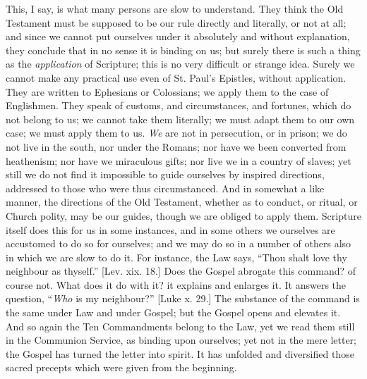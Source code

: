 This, I say, is what many persons are slow to understand. They
think the Old Testament must be supposed to be our rule directly and
literally, or not at all; and since we cannot put ourselves under it
absolutely and without explanation, they conclude that in no sense it
is binding on us; but surely there is such a thing as the \emph{application}
of Scripture; this is no very difficult or strange idea. Surely we
cannot make any practical use even of St. Paul's Epistles, without
application. They are written to Ephesians or Colossians; we apply
them to the case of Englishmen. They speak of customs, and
circumstances, and fortunes, which do not belong to us; we cannot take
them literally; we must adapt them to our own case; we must apply them
to us. \emph{We} are not in persecution, or in prison; we do not live
in the south, nor under the Romans; nor have we been converted from
heathenism; nor have we miraculous gifts; nor live we in a country of
slaves; yet still we do not find it impossible to guide ourselves by
inspired directions, addressed to those who were thus circumstanced.
And in somewhat a like manner, the directions of the Old Testament,
whether as to conduct, or ritual, or Church polity, may be our guides,
though we are obliged to apply them. Scripture itself does this for us
in some instances, and in some others we ourselves are accustomed to
do so for ourselves; and we may do so in a number of others also in
which we are slow to do it. For instance, the Law says, ``Thou
shalt love thy neighbour as thyself.'' [Lev. xix. 18.] Does the
Gospel abrogate this command? of course not. What does it do with it?
it explains and enlarges it. It answers the question, ``\emph{Who}
is my neighbour?'' [Luke x. 29.] The substance of the command is
the same under Law and under Gospel; but the Gospel opens and elevates
it. And so again the Ten Commandments belong to the Law, yet we read
them still in the Communion Service, as binding upon ourselves; yet
not in the mere letter; the Gospel has turned the letter into spirit.
It has unfolded and diversified those sacred precepts which were given
from the beginning.

